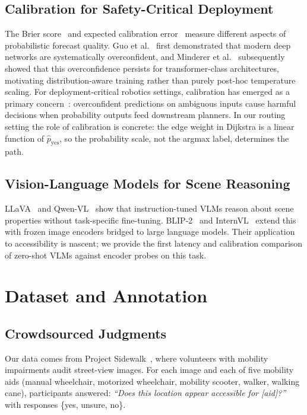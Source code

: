 \documentclass[conference]{IEEEtran}
\begin{document}
\subsection{Calibration for Safety-Critical Deployment}
The Brier score~\cite{brier1950verification} and expected calibration error~\cite{guo2017calibration} measure different aspects of probabilistic forecast quality. Guo et al.~\cite{guo2017calibration} first demonstrated that modern deep networks are systematically overconfident, and Minderer et al.~\cite{minderer2021revisiting} subsequently showed that this overconfidence persists for transformer-class architectures, motivating distribution-aware training rather than purely post-hoc temperature scaling. For deployment-critical robotics settings, calibration has emerged as a primary concern~\cite{zollo2025calibration}: overconfident predictions on ambiguous inputs cause harmful decisions when probability outputs feed downstream planners. In our routing setting the role of calibration is concrete: the edge weight in Dijkstra is a linear function of $\hat{p}_\mathrm{yes}$, so the probability scale, not the argmax label, determines the path.

\subsection{Vision-Language Models for Scene Reasoning}
LLaVA~\cite{liu2023llava} and Qwen-VL~\cite{bai2023qwenvl} show that instruction-tuned VLMs reason about scene properties without task-specific fine-tuning. BLIP-2~\cite{10.5555/3618408.3619222} and InternVL~\cite{chen2024internvl} extend this with frozen image encoders bridged to large language models. Their application to accessibility is nascent; we provide the first latency and calibration comparison of zero-shot VLMs against encoder probes on this task.

\section{Dataset and Annotation}
\label{sec:dataset}

\subsection{Crowdsourced Judgments}

Our data comes from Project Sidewalk~\cite{Saha_ProjectSidewalk_CHI2019,DBLP:journals/corr/abs-2502-19888}, where volunteers with mobility impairments audit street-view images. For each image and each of five mobility aids (manual wheelchair, motorized wheelchair, mobility scooter, walker, walking cane), participants answered: \textit{``Does this location appear accessible for [aid]?''} with responses \{yes, unsure, no\}.
\end{document}
